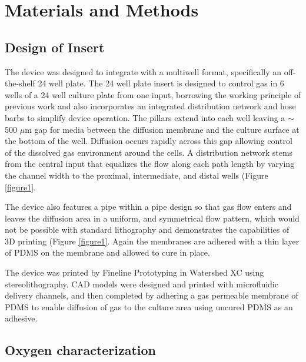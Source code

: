 \section*{Materials and Methods}


\subsection*{Design of Insert}

The device was designed to integrate with a multiwell format, specifically an off-the-shelf 24 well plate. 
The 24 well plate insert is designed to control gas in 6 wells of a 24 well culture plate from one input, borrowing the working principle of previous work\cite{oppegard2010} and also incorporates an integrated distribution network and hose barbs to simplify device operation.
The pillars extend into each well leaving a $\sim$500 $\mu$m gap for media between the diffusion membrane and the culture surface at the bottom of the well.
Diffusion occurs rapidly across this gap allowing control of the dissolved gas environment around the cells. 
A distribution network stems from the central input that equalizes the flow along each path length by varying the channel width to the proximal, intermediate, and distal wells (Figure \ref{figure1}.

The device also features a pipe within a pipe design so that gas flow enters and leaves the diffusion area in a uniform, and symmetrical flow pattern, which would not be possible with standard lithography and demonstrates the capabilities of 3D printing (Figure \ref{figure1}.
Again the membranes are adhered with a thin layer of PDMS on the membrane and allowed to cure in place.

The device was printed by Fineline Prototyping in Watershed XC using stereolithography.
CAD models were designed and printed with microfluidic delivery channels, and then completed by adhering a gas permeable membrane of PDMS to enable diffusion of gas to the culture area using uncured PDMS as an adhesive. 

\subsection*{Oxygen characterization}

